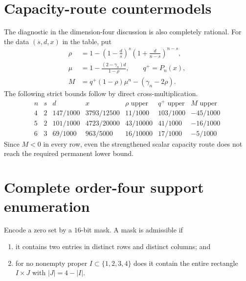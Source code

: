 \documentclass[11pt]{amsart}
\theoremstyle{definition}
\theoremstyle{remark}
\newenvironment{exacttable}
  {\begingroup\small
   \setlength{\arraycolsep}{4pt}%
   \renewcommand{\arraystretch}{1.12}}
  {\endgroup}
\begin{document}
\section{Capacity-route countermodels}
\label{app:capacity-controls}

The diagnostic in the dimension-four discussion is also completely
rational.  For the data \((s,d,x)\) in the table, put
\[
\begin{split}
\rho&=1-\left(1-\frac ds\right)^s
          \left(1+\frac d{n-s}\right)^{n-s},\\
\mu&=1-\frac{(2-\gamma_n)d}{1-\rho},\qquad
q^+=P_n(x),\\
M&=q^+(1-\rho)\mu^n-(\gamma_n-2\rho).
\end{split}
\]
The following strict bounds follow by direct cross-multiplication.
\begin{exacttable}
\[
\begin{array}{c|c|c|c|c|c|c}
n&s&d&x&\rho\text{ upper}&q^+\text{ upper}&M\text{ upper}\\ \hline
4&2&147/1000&3793/12500&11/1000&103/1000&-45/1000\\
5&2&101/1000&4723/20000&43/10000&41/1000&-16/1000\\
6&3&69/1000&963/5000&16/10000&17/1000&-5/1000
\end{array}
\tag{C.1}
\]
\end{exacttable}
Since \(M<0\) in every row, even the strengthened scalar capacity route
does not reach the required permanent lower bound.

\section{Complete order-four support enumeration}
\label{app:support-enumeration}

Encode a zero set by a \(16\)-bit mask.  A mask is admissible if

\begin{enumerate}
\item it contains two entries in distinct rows and distinct columns; and
\item for no nonempty proper \(I\subset\{1,2,3,4\}\) does it contain the
  entire rectangle \(I\times J\) with \(|J|=4-|I|\).
\end{enumerate}
\end{document}
